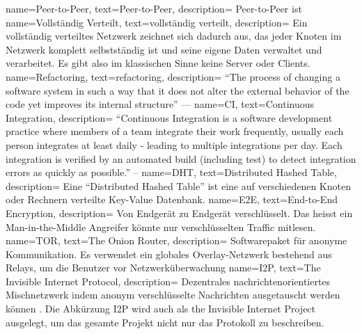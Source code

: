 \makeglossaries
                 { name={Peer-to-Peer},                  text={Peer-to-Peer},           description={{
    Peer-to-Peer ist
}}}
 { name={Vollständig Verteilt},                   text={vollständig verteilt},            description={{
    Ein vollständig verteiltes Netzwerk zeichnet sich dadurch aus, das jeder Knoten
    im Netzwerk komplett selbstständig ist und seine eigene Daten verwaltet und verarbeitet. Es gibt also im klassischen Sinne keine Server oder Clients.
}}}
         { name={Refactoring},                   text={refactoring},            description={{
    ``The process of changing a software system in such a way that it does
        not alter the external behavior of the code yet improves its internal
        structure'' ---\cite{fowler_refactoring_2018}
}}}
                  { name={CI},        text={Continuous Integration}, description={{
    ``Continuous Integration is a software development practice where members
    of a team integrate their work frequently,                                 usually each person integrates
    at least daily - leading to multiple integrations per day. Each integration
    is verified by an automated build (including test) to detect integration
    errors as quickly as possible.'' -- \cite{fowler_continuos_2014}
}}}
                 { name={DHT},        text={Distributed Hashed Table},                    description={{
    Eine ``Distributed Hashed Table'' ist eine auf verschiedenen Knoten oder Rechnern verteilte Key-Value Datenbank.
}}}
                 { name={E2E},        text={End-to-End Encryption},                     description={{
    Von Endgerät zu Endgerät verschlüsselt. Das heisst ein Man-in-the-Middle Angreifer könnte nur verschlüsselten Traffic mitlesen.
}}}
                 { name={TOR},        text={The Onion Router},                          description={{
    Softwarepaket für anonyme Kommunikation. Es verwendet ein globales Overlay-Netzwerk bestehend aus Relays, um die Benutzer vor Netzwerküberwachung 
}}}
                 { name={I2P},        text={The Invisible Internet Protocol},                          description={{
            Dezentrales nachrichtenorientiertes Mischnetzwerk indem anonym verschlüsselte Nachrichten ausgetauscht werden können \parencite[p.~1]{zantout_i2p_2011}. Die Abkürzung I2P wird auch als the Invisible Internet Project ausgelegt, um das gesamte Projekt nicht nur das Protokoll zu beschreiben.
}}}
